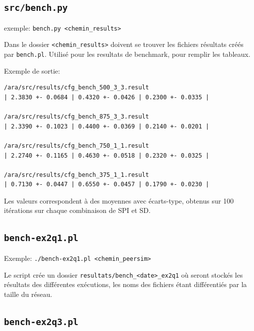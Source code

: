\documentclass[a4paper]{article}
\begin{document}
\begin{appendix}
    \subsection{\texttt{src/bench.py}}
    exemple: \texttt{bench.py <chemin\_results>}

    Dans le dossier \texttt{<chemin\_results>} doivent se trouver les fichiers résultats créés par \texttt{bench.pl}. Utilisé pour les resultats de benchmark, pour remplir les tableaux.

Exemple de sortie:
\begin{verbatim}
/ara/src/results/cfg_bench_500_3_3.result
| 2.3830 +- 0.0684 | 0.4320 +- 0.0426 | 0.2300 +- 0.0335 |

/ara/src/results/cfg_bench_875_3_3.result
| 2.3390 +- 0.1023 | 0.4400 +- 0.0369 | 0.2140 +- 0.0201 |

/ara/src/results/cfg_bench_750_1_1.result
| 2.2740 +- 0.1165 | 0.4630 +- 0.0518 | 0.2320 +- 0.0325 |

/ara/src/results/cfg_bench_375_1_1.result
| 0.7130 +- 0.0447 | 0.6550 +- 0.0457 | 0.1790 +- 0.0230 |
\end{verbatim}
Les valeurs correspondent à des moyennes avec écarts-type, obtenus sur
100 itérations sur chaque combinaison de SPI et SD.

\subsection{\texttt{bench-ex2q1.pl}}
Exemple: \texttt{./bench-ex2q1.pl <chemin\_peersim>}

Le script crée un dossier \texttt{resultats/bench\_<date>\_ex2q1} où
seront stockés les résultats des différentes exécutions, les noms des fichiers
étant différentiés par la taille du réseau.

\subsection{\texttt{bench-ex2q3.pl}}

\end{appendix}
\end{document}
